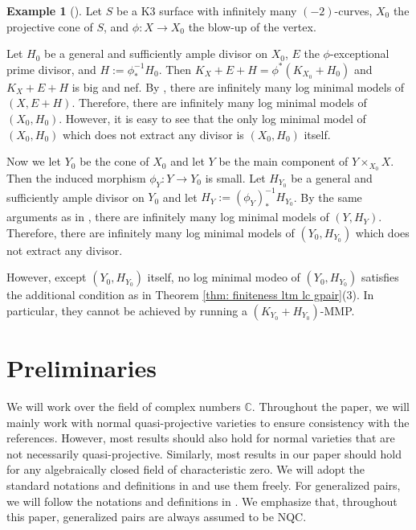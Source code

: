 \documentclass[11pt]{amsart}
\numberwithin{equation}{section}
\newcommand{\Cc}{\mathbb{C}}
\theoremstyle{definition}
\theoremstyle{definition}
\newtheorem{ex}[thm]{Example}
\theoremstyle{definition}
\begin{document}
\begin{ex}[{\cite{Gon09}}]
 Let $S$ be a K3 surface with  infinitely many $(-2)$-curves, $X_0$ the projective cone of $S$, and $\phi: X\rightarrow X_0$ the blow-up of the vertex.
 
 Let $H_0$ be a general and sufficiently ample divisor on $X_0$, $E$ the $\phi$-exceptional prime divisor, and $H:=\phi^{-1}_*H_0$. Then $K_X+E+H=\phi^*(K_{X_0}+H_0)$ and $K_X+E+H$ is big and nef.  By \cite[Example 0.3]{Gon09}, there are infinitely many log minimal models of $(X,E+H)$. Therefore, there are infinitely many log minimal models of $(X_0,H_0)$. However, it is easy to see that the only log minimal model of $(X_0,H_0)$ which does not extract any divisor is $(X_0,H_0)$ itself.
 

Now we let $Y_0$ be the cone of $X_0$ and let $Y$ be the main component of $Y\times_{X_0}X$. Then the induced morphism $\phi_Y: Y\rightarrow Y_0$ is small. Let $H_{Y_0}$ be a general and sufficiently ample divisor on $Y_0$ and let $H_Y:=(\phi_Y)^{-1}_*H_{Y_0}$. By the same arguments as in \cite[Example 0.3]{Gon09},  there are infinitely many log minimal models of $(Y,H_Y)$. Therefore, there are infinitely many log minimal models of $(Y_0,H_{Y_0})$ which does not extract any divisor. 

However, except $(Y_0,H_{Y_0})$ itself, no log minimal modeo of $(Y_0,H_{Y_0})$ satisfies the additional condition as in Theorem \ref{thm: finiteness ltm lc gpair}(3). In particular, they cannot be achieved by running a $(K_{Y_0}+H_{Y_0})$-MMP.
\end{ex}


\section{Preliminaries}

We will work over the field of complex numbers $\Cc$. Throughout the paper, we will mainly work with normal quasi-projective varieties to ensure consistency with the references. However, most results should also hold for normal varieties that are not necessarily quasi-projective. Similarly, most results in our paper should hold for any algebraically closed field of characteristic zero. We will adopt the standard notations and definitions in \cite{KM98, BCHM10} and use them freely. For generalized pairs, we will follow the notations and definitions in \cite{HL21}. We emphasize that, throughout this paper, generalized pairs are always assumed to be NQC.
\end{document}
